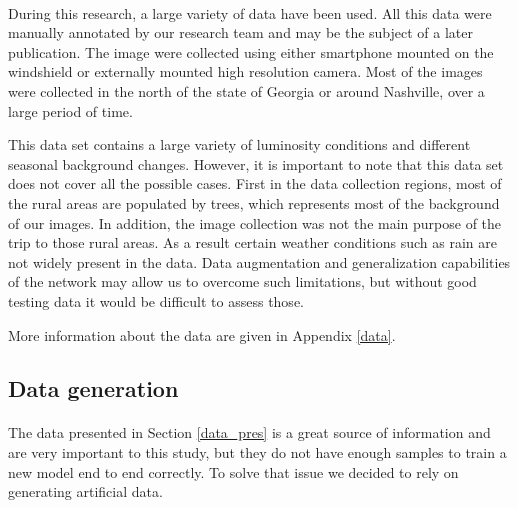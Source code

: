 \paragraph{}
During this research, a large variety of data have been used. All this data were manually annotated by our research team and may be the subject of a later publication. The image were collected using either smartphone mounted on the windshield or externally mounted high resolution camera. Most of the images were collected in the north of the state of Georgia or around Nashville, over a large period of time.

This data set contains a large variety of  luminosity conditions and different seasonal background changes. However, it is important to note that this data set does not cover all the possible cases. First in the data collection regions, most of the rural areas are populated by trees, which represents most of the background of our images. In addition, the image collection was not the main purpose of the trip to those rural areas. As a result certain weather conditions such as rain are not widely present in the data. Data augmentation and generalization capabilities of the network may allow us to overcome such limitations, but without good testing data it would be difficult to assess those.

More information about the data are given in Appendix \ref{data}.

\subsection{Data generation} \label{sec:dataGen}
\paragraph{}
The data presented in Section \ref{data_pres} is a great source of information and are very important to this study, but they do not have enough samples to train a new model end to end correctly. To solve that issue we decided to rely on generating artificial data.

